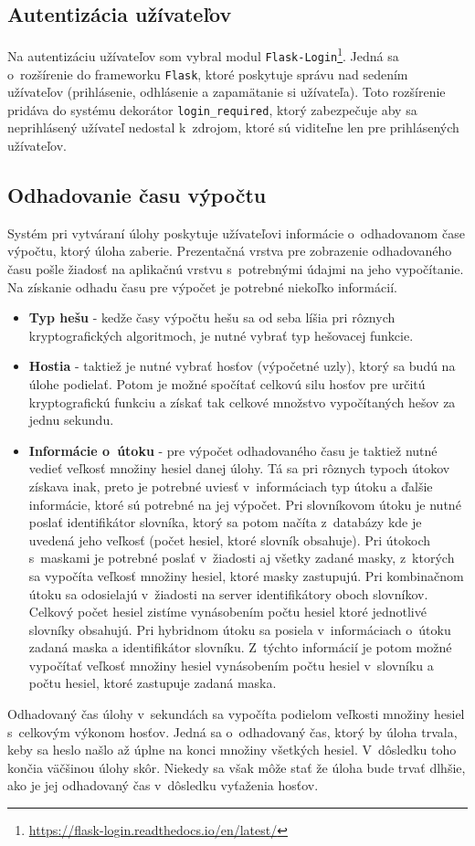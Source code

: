 \documentclass[slovak]{fitthesis}
\begin{document}
\subsection{Autentizácia užívateľov}
Na autentizáciu užívateľov som vybral modul \texttt{Flask-Login}\footnote{\url{https://flask-login.readthedocs.io/en/latest/}}. Jedná sa o~rozšírenie do frameworku \texttt{Flask}, ktoré poskytuje správu nad sedením užívateľov (prihlásenie, odhlásenie a zapamätanie si užívateľa). Toto rozšírenie pridáva do systému dekorátor \texttt{login\_required}, ktorý zabezpečuje aby sa neprihlásený užívateľ nedostal k~zdrojom, ktoré sú viditeľne len pre prihlásených užívateľov.


\subsection{Odhadovanie času výpočtu}
Systém pri vytváraní úlohy poskytuje užívateľovi informácie o~odhadovanom čase výpočtu, ktorý úloha zaberie. Prezentačná vrstva pre zobrazenie odhadovaného času pošle žiadosť na aplikačnú vrstvu s~potrebnými údajmi na jeho vypočítanie. Na získanie odhadu času pre výpočet je potrebné niekoľko informácií. 
\begin{itemize}
    \item \textbf{Typ hešu} - kedže časy výpočtu hešu sa od seba líšia pri rôznych kryptografických algoritmoch, je nutné vybrať typ hešovacej funkcie.
    \item \textbf{Hostia} - taktiež je nutné vybrať hosťov (výpočetné uzly), ktorý sa budú na úlohe podielať. Potom je možné spočítať celkovú silu hosťov pre určitú kryptografickú funkciu a získať tak celkové množstvo vypočítaných hešov za jednu sekundu.
    \item \textbf{Informácie o~útoku} - pre výpočet odhadovaného času je taktiež nutné vedieť veľkosť množiny hesiel danej úlohy. Tá sa pri rôznych typoch útokov získava inak, preto je potrebné uviesť v~informáciach typ útoku a ďalšie informácie, ktoré sú potrebné na jej výpočet. Pri slovníkovom útoku je nutné poslať identifikátor slovníka, ktorý sa potom načíta z~databázy kde je uvedená jeho veľkosť (počet hesiel, ktoré slovník obsahuje). Pri útokoch s~maskami je potrebné poslať v~žiadosti aj všetky zadané masky, z~ktorých sa vypočíta veľkosť množiny hesiel, ktoré masky zastupujú. Pri kombinačnom útoku sa odosielajú v~žiadosti na server identifikátory oboch slovníkov. Celkový počet hesiel zistíme vynásobením počtu hesiel ktoré jednotlivé slovníky obsahujú. Pri hybridnom útoku sa posiela v~informáciach o~útoku zadaná maska a identifikátor slovníku. Z~týchto informácií je potom možné vypočítať veľkosť množiny hesiel vynásobením počtu hesiel v~slovníku a počtu hesiel, ktoré zastupuje zadaná maska.
\end{itemize}
Odhadovaný čas úlohy v~sekundách sa vypočíta podielom veľkosti množiny hesiel s~celkovým výkonom hosťov. Jedná sa o~odhadovaný čas, ktorý by úloha trvala, keby sa heslo našlo až úplne na konci množiny všetkých hesiel. V~dôsledku toho končia väčšinou úlohy skôr. Niekedy sa však môže stať že úloha bude trvať dlhšie, ako je jej odhadovaný čas v~dôsledku vyťaženia hosťov.
\end{document}
